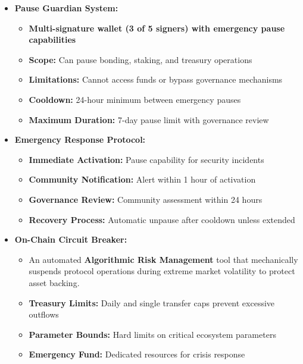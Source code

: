 \documentclass[
  paper=a4,
  ,captions=tableheading
]{scrartcl}
\providecommand{\tightlist}{%
  \setlength{\itemsep}{0pt}\setlength{\parskip}{0pt}}
\begin{document}
\begin{itemize}
\tightlist
\item
  \textbf{Pause Guardian System:}

  \begin{itemize}
  \tightlist
  \item
    \textbf{Multi-signature wallet (3 of 5 signers) with emergency pause
    capabilities}
  \item
    \textbf{Scope:} Can pause bonding, staking, and treasury operations
  \item
    \textbf{Limitations:} Cannot access funds or bypass governance
    mechanisms
  \item
    \textbf{Cooldown:} 24-hour minimum between emergency pauses
  \item
    \textbf{Maximum Duration:} 7-day pause limit with governance review
  \end{itemize}
\item
  \textbf{Emergency Response Protocol:}

  \begin{itemize}
  \tightlist
  \item
    \textbf{Immediate Activation:} Pause capability for security
    incidents
  \item
    \textbf{Community Notification:} Alert within 1 hour of activation
  \item
    \textbf{Governance Review:} Community assessment within 24 hours
  \item
    \textbf{Recovery Process:} Automatic unpause after cooldown unless
    extended
  \end{itemize}
\item
  \textbf{On-Chain Circuit Breaker:}

  \begin{itemize}
  \tightlist
  \item
    An automated \textbf{Algorithmic Risk Management} tool that mechanically suspends protocol operations during extreme market volatility to protect asset backing.
  \item
    \textbf{Treasury Limits:} Daily and single transfer caps prevent
    excessive outflows
  \item
    \textbf{Parameter Bounds:} Hard limits on critical ecosystem
    parameters
  \item
    \textbf{Emergency Fund:} Dedicated resources for crisis response
  \end{itemize}
\end{itemize}
\end{document}
